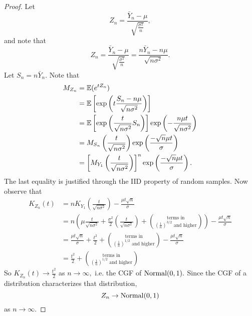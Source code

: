 \begin{proof}
    Let 
\[Z_n= \frac{\bar Y_n-\mu}{\sqrt{\frac{\sigma^2}{n}}},\]
	and note that
	$$Z_n=\frac{\bar{Y}_n-\mu}{\sqrt{\frac{\sigma^2}{n}}}=\frac{n\bar Y_n-n\mu}{\sqrt{n \sigma^2}}.$$
    Let $S_n=n\bar{Y}_n$. Note that
    \begin{align*}
        M_{Z_n}&=\mathbb E(e^{tZ_n}) \\
        &=\mathbb E\left[\exp\left(t\frac{S_n -n\mu}{\sqrt{n\sigma^2}}\right)\right]\\
        &=\mathbb E\left[\exp\left(\frac{t}{\sqrt{n\sigma^2}}S_n\right)\right]\exp\left(-\frac{n\mu t}{\sqrt{n\sigma^2}}\right)\\
        &=M_{S_n}\left(\frac{t}{\sqrt{n\sigma^2}}\right)\exp\left(\frac{-\sqrt n \mu t}{\sigma}\right) \\
        &=\left[M_{Y_1}\left(\frac{t}{\sqrt{n\sigma^2}}\right)\right]^n
        \exp\left(\frac{-\sqrt n \mu t}{\sigma}\right).
    \end{align*}
    The last equality is justified through the IID property of random samples. Now observe that
    \begin{align*}
        K_{Z_n}(t)&=nK_{Y_1}\left(\frac{t}{\sqrt{n\sigma^2}}\right)-\frac{\mu t\sqrt n}{\sigma} \\
        &= n\left(\mu\frac{t}{\sqrt{n\sigma^2}}
        +\frac{\sigma^2}{2}\left(\frac{t}{\sqrt{n\sigma^2}}\right)+\binom{\text{terms in}}{\left(\frac{1}{n}\right)^{3/2}\text{ and higher}}\right) - \frac{\mu t\sqrt n}{\sigma} \\
        &=\frac{\mu t\sqrt n}{\sigma} + \frac{t^2}{2}+ \binom{\text{terms in}}{\left(\frac{1}{n}\right)^{1/2}\text{ and higher}}- \frac{\mu t\sqrt n}{\sigma} \\
		&=\frac{t^2}{2} + \binom{\text{terms in}}{\left(\frac{1}{n}\right)^{1/2}\text{ and higher}}
    \end{align*}
    So $K_{Z_n}(t)\to \frac{t^2}{2}$ as $n\to \infty,$ i.e. the CGF of $\operatorname*{Normal}(0,1).$ Since the CGF of a distribution characterizes that distribution,
    $$
    Z_n\to \operatorname*{Normal}(0,1)
    $$
	as $n\to \infty$.
    \end{proof}

